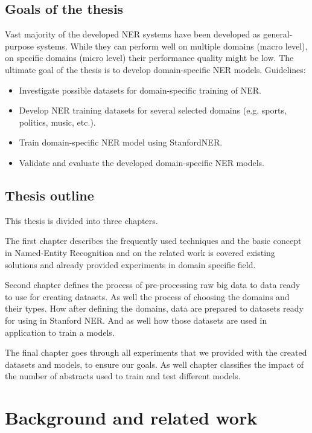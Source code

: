 \documentclass[thesis=M,english]{FITthesis}[2018/05/30]
\begin{document}
\begin{introduction}
\section{Goals of the thesis}	
	Vast majority of the developed NER systems have been developed as general-purpose systems. While they can perform well on multiple domains (macro level), on specific domains (micro level) their performance quality might be low. The ultimate goal of the thesis is to develop domain-specific NER models. Guidelines:
\begin{itemize}
	\item Investigate possible datasets for domain-specific training of NER.
	\item Develop NER training datasets for several selected domains (e.g. sports,
politics, music, etc.).
	\item Train domain-specific NER model using StanfordNER.
	\item Validate and evaluate the developed domain-specific NER models. 
\end{itemize}	
	
\section{Thesis outline}

This thesis is divided into three chapters.

The first chapter describes the frequently used techniques and the basic concept in Named-Entity Recognition and on the related work is covered existing solutions and already provided experiments in domain specific field.

Second chapter defines the process of pre-processing raw big data to data ready to use for creating datasets. As well the process of choosing the domains and their types. How after defining the domains, data are prepared to datasets ready for using in Stanford NER. And as well how those datasets are used in application to train a models.

The final chapter goes through all experiments that we provided with the created datasets and models, to ensure our goals. As well chapter classifies the impact of the number of abstracts used to train and test different models.
	

\end{introduction}

\chapter{Background and related work}\label{}
\end{document}
